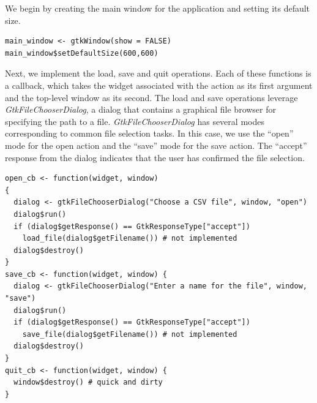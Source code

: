 \documentclass[article]{jss}
\begin{document}
We begin by creating the main window for the application and setting its default size.
\begin{verbatim}
main_window <- gtkWindow(show = FALSE)
main_window$setDefaultSize(600,600)
\end{verbatim}

Next, we implement the 
load, save and quit operations. Each of these functions is a callback, which
takes the widget associated with the action as its first argument and
the top-level window as its second. The load and save operations leverage
\emph{GtkFileChooserDialog}, a dialog that contains a graphical file browser 
for specifying the path to a file. \emph{GtkFileChooserDialog}
has several modes corresponding to common file selection tasks. In this case, 
we use the ``open'' mode for the open action and the ``save'' mode for
the save action. The ``accept'' response from the dialog indicates that the user
has confirmed the file selection.
\begin{verbatim}
open_cb <- function(widget, window)  
{
  dialog <- gtkFileChooserDialog("Choose a CSV file", window, "open")
  dialog$run()
  if (dialog$getResponse() == GtkResponseType["accept"])
    load_file(dialog$getFilename()) # not implemented
  dialog$destroy()
}
save_cb <- function(widget, window) {
  dialog <- gtkFileChooserDialog("Enter a name for the file", window, "save")
  dialog$run()
  if (dialog$getResponse() == GtkResponseType["accept"])
    save_file(dialog$getFilename()) # not implemented
  dialog$destroy()
}
quit_cb <- function(widget, window) {
  window$destroy() # quick and dirty
}
\end{verbatim}
\end{document}
